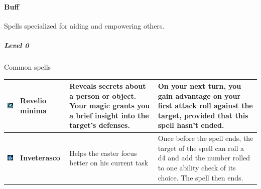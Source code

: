 
\paragraph{Buff} 
Spells specialized for aiding and empowering others. \\


\subparagraph{Level 0} 
Common spells \\
\begin{tabular}{ m{2cm}m{3cm}m{4cm}m{6cm} } \hline
	\includegraphics[width=2cm]{../Pictures/Gameplay/Spells/Icon/Revelio_minima_spell_icon.jpg} & \textbf{Revelio minima} & Reveals secrets about a person or object. Your magic grants you a brief insight into the target's defenses. & On your next turn, you gain advantage on your first attack roll against the target, provided that this spell hasn't ended. \\ \hline
   \includegraphics[width=2cm]{../Pictures/Gameplay/Spells/Icon/Inveterasco_spell_icon.png} & \textbf{Inveterasco} & Helps the caster focus better on his current task & Once before the spell ends, the target of the spell can roll a d4 and add the number rolled to one ability check of its choice. The spell then ends. \\ \hline
\end{tabular}

